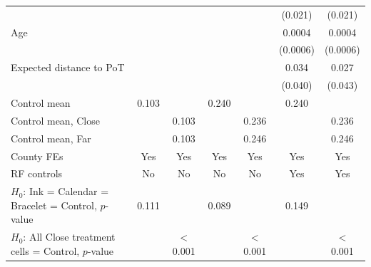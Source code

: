 \begin{tabular}{lcccccc}
                                                         &              &                              &               &                               & (0.021)       & (0.021)\\   
   Age                                                   &              &                              &               &                               & 0.0004        & 0.0004\\   
                                                         &              &                              &               &                               & (0.0006)      & (0.0006)\\   
   Expected distance to PoT                              &              &                              &               &                               & 0.034         & 0.027\\   
                                                         &              &                              &               &                               & (0.040)       & (0.043)\\   
   Control mean                                          & 0.103        &                              & 0.240         &                               & 0.240         & \\  
   Control mean, Close                                   &              & 0.103                        &               & 0.236                         &               & 0.236\\  
   Control mean, Far                                     &              & 0.103                        &               & 0.246                         &               & 0.246\\  
   County FEs                                            & Yes          & Yes                          & Yes           & Yes                           & Yes           & Yes\\  
   RF controls                                           & No           & No                           & No            & No                            & Yes           & Yes\\  
   $H_0$: Ink = Calendar = Bracelet = Control, $p$-value & 0.111        &                              & 0.089         &                               & 0.149         & \\  
   $H_0$: All Close treatment cells = Control, $p$-value &              & $<$0.001                     &               & $<$0.001                      &               & $<$0.001\\  

\end{tabular}
